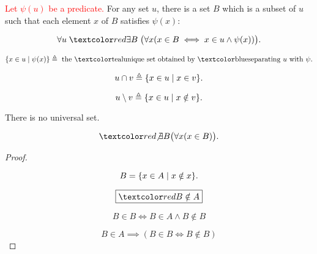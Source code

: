 \begin{frame}{}
  \begin{axiom}
    \textcolor<2->{red}{Let $\psi(u)$ be a predicate.}
    For any set $u$, there is a set $B$
    which is a subset of $u$ such that each element $x$ of $B$ satisfies $\psi(x)$:

    \[
      \forall u\; \red{\exists B}\; \big( \forall x (x \in B \iff x \in u \land \psi(x)) \big).
    \]
  \end{axiom}

  \begin{definition}
    \[
      \set{x \in u \mid \psi(x)} \triangleq \text{ the \teal{unique} set obtained by \blue{separating} } u \text{ with } \psi.
    \]
  \end{definition}
\end{frame}

\begin{frame}{}
  \begin{definition}[$u \cap v$]
    \[
      u \cap v \triangleq \{x \in u \mid x \in v\}.
    \]
  \end{definition}

  \pause
  \begin{theorem}[]
  \end{theorem}

  \pause
  \begin{definition}[$u \setminus v$]
    \[
      u \setminus v \triangleq \{x \in u \mid x \notin v\}.
    \]
  \end{definition}
\end{frame}

\begin{frame}{}
  \begin{theorem}
    There is no universal set.

    \[
      \red{\not\exists} B \big(\forall x (x \in B) \big).
    \]
  \end{theorem}

  \pause
  \begin{proof}
    \begin{center}
    \end{center}

    \pause
    \[
      B = \{x \in A \mid x \notin x\}.
    \]

    \pause
    \[
      \boxed{\red{B \notin A}}
    \]

    \pause
    \[
      B \in B \iff B \in A \land B \notin B
    \]

    \pause
    \vspace{-0.50cm}
    \[
      B \in A \implies (B \in B \iff B \notin B)
    \]
  \end{proof}
\end{frame}


